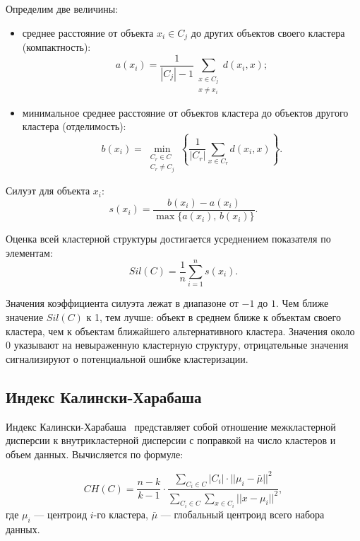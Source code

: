 Определим две величины:

\begin{itemize}
	\item[---] среднее расстояние от объекта $x_i \in C_j$ до других объектов своего кластера (компактность):
	\begin{equation}
		a(x_i) = \frac{1}{|C_j| - 1} \sum_{\substack{x \in C_j \\ x \neq x_i}} d(x_i, x);
	\end{equation}
	\item[---] минимальное среднее расстояние от объектов кластера до объектов другого кластера (отделимость):
	\begin{equation}
		b(x_i) = \min_{\substack{C_r \in C \\ C_r \neq C_j}}
		\left\{\frac{1}{|C_r|}\sum_{x \in C_r} d(x_i, x)\right\}.
	\end{equation}

\end{itemize}

Силуэт для объекта $x_i$:
\begin{equation}
	s(x_i)=\frac{b(x_i)-a(x_i)}{\max\{a(x_i),\, b(x_i)\}}.
\end{equation}

Оценка всей кластерной структуры достигается усреднением показателя по элементам:
\begin{equation}
	Sil(C)=\frac{1}{n}\sum_{i=1}^{n} s(x_i).
\end{equation}


Значения коэффициента силуэта лежат в диапазоне от $-1$ до $1$. Чем ближе значение $Sil(C)$ к 1, тем лучше: объект в среднем ближе к объектам своего кластера, чем к объектам ближайшего альтернативного кластера. Значения около 0 указывают на невыраженную кластерную структуру, отрицательные значения сигнализируют о потенциальной ошибке кластеризации.

\subsection{Индекс Калински-Харабаша}

Индекс Калински-Харабаша~\cite{mark_of_clast} представляет собой отношение межкластерной дисперсии к внутрикластерной дисперсии с поправкой на число кластеров и объем данных. Вычисляется по формуле:

\begin{equation}
	CH(C) = \frac{n - k}{k - 1} \cdot \frac{\sum\limits_{C_i \in C} |C_i| \cdot ||\mu_i - \bar{\mu}||^2}{\sum\limits_{C_i \in C}\sum \limits_{x \in C_i} ||x - \mu_i||^2},
\end{equation}
где $\mu_i$ --- центроид $i$-го кластера, $\bar{\mu}$ --- глобальный центроид всего набора данных.


